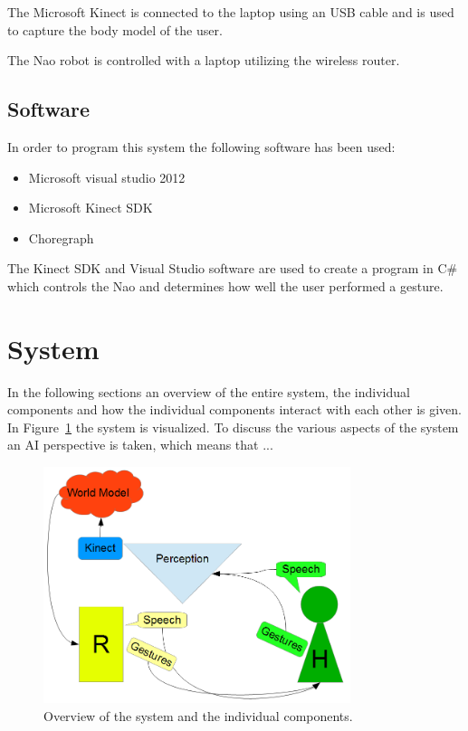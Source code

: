 \documentclass[10pt,a4paper,oneside]{scrartcl}
\begin{document}
The Microsoft Kinect is connected to the laptop using an USB cable and is used to capture the body model of the user. 

The Nao robot is controlled with a laptop utilizing the wireless router. 

\subsection{Software}
In order to program this system the following software has been used:
\begin{itemize}
  \item Microsoft visual studio 2012
  \item Microsoft Kinect SDK
  \item Choregraph
\end{itemize}

The Kinect SDK and Visual Studio software are used to create a program in C\# which controls the Nao and determines how well the user performed a gesture. 

\section{System}
In the following sections an overview of the entire system, the individual components and how the individual components interact with each other is given.
In Figure~\ref{fig:system} the system is visualized.
To discuss the various aspects of the system an AI perspective is taken, which means that ... 

\begin{figure}[!ht]
	\centering
	\includegraphics[width=0.8\textwidth]{images/system.png}
	\caption{Overview of the system and the individual components.}
	\label{fig:system}
\end{figure}
\end{document}

